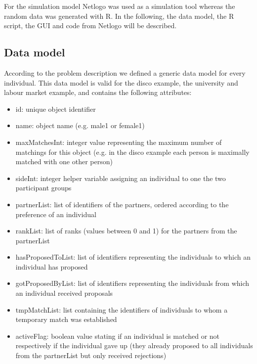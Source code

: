 \label{prototype}
For the simulation model Netlogo was used as a simulation tool whereas the random data was generated with R.
In the following, the data model, the R script, the GUI and code from Netlogo will be described.
\subsection{Data model}
According to the problem description we defined a generic data model for every individual.
This data model is valid for the disco example, the university and labour market example, and contains the following attributes:
\begin{itemize}
	\item id: unique object identifier
	\item name: object name (e.g. male1 or female1)
	\item maxMatchesInt: integer value representing the maximum number of matchings for this object (e.g. in the disco example each person is maximally matched with one other person)
	\item sideInt: integer helper variable assigning an individual to one the two participant groups
	\item partnerList: list of identifiers of the partners, ordered according to the preference of an individual
	\item rankList: list of ranks (values between 0 and 1) for the partners from the partnerList 
	\item hasProposedToList: list of identifiers representing the individuals to which an individual has proposed
	\item gotProposedByList: list of identifiers representing the individuals from which an individual received proposals
	\item tmpMatchList: list containing the identifiers of individuals to whom a temporary match was established
	\item activeFlag: boolean value stating if an individual is matched or not respectively if the individual gave up (they already proposed to all individuals from the partnerList but only received rejections)
\end{itemize}

